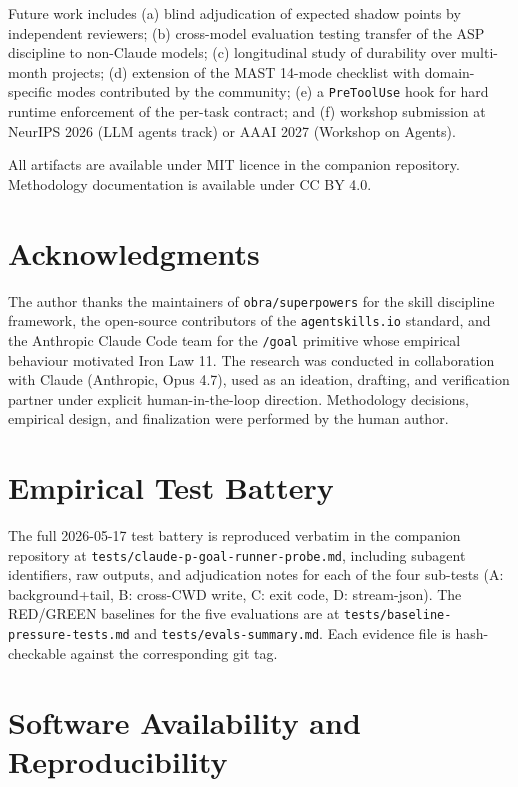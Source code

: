 \documentclass[11pt, a4paper]{article}
\begin{document}
Future work includes (a) blind adjudication of expected shadow points by independent reviewers; (b) cross-model evaluation testing transfer of the ASP discipline to non-Claude models; (c) longitudinal study of durability over multi-month projects; (d) extension of the MAST 14-mode checklist with domain-specific modes contributed by the community; (e) a \texttt{PreToolUse} hook for hard runtime enforcement of the per-task contract; and (f) workshop submission at NeurIPS 2026 (LLM agents track) or AAAI 2027 (Workshop on Agents).

All artifacts are available under MIT licence in the companion repository. Methodology documentation is available under CC BY 4.0.

\section*{Acknowledgments}

The author thanks the maintainers of \texttt{obra/superpowers} for the skill discipline framework, the open-source contributors of the \texttt{agentskills.io} standard, and the Anthropic Claude Code team for the \texttt{/goal} primitive whose empirical behaviour motivated Iron Law 11. The research was conducted in collaboration with Claude (Anthropic, Opus 4.7), used as an ideation, drafting, and verification partner under explicit human-in-the-loop direction. Methodology decisions, empirical design, and finalization were performed by the human author.



\appendix

\section{Empirical Test Battery}
\label{app:battery}

The full 2026-05-17 test battery is reproduced verbatim in the companion repository at \texttt{tests/claude-p-goal-runner-probe.md}, including subagent identifiers, raw outputs, and adjudication notes for each of the four sub-tests (A: background+tail, B: cross-CWD write, C: exit code, D: stream-json). The RED/GREEN baselines for the five evaluations are at \texttt{tests/baseline-pressure-tests.md} and \texttt{tests/evals-summary.md}. Each evidence file is hash-checkable against the corresponding git tag.

\section{Software Availability and Reproducibility}
\label{app:reproduce}
\end{document}
